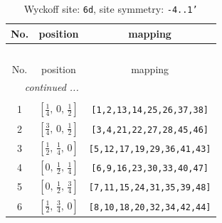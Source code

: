 \documentclass[fleqn,8pt]{jsarticle}
\begin{document}
\begin{longtable}{ccc}
\caption{Wyckoff site: {\tt 6d}, site symmetry: {\tt -4..1'}}
 \\
 \hline \hline
No. & position & mapping \\ \hline \endfirsthead

\multicolumn{2}{l}{\tablename\ \thetable{}} \\
 \hline \hline
No. & position & mapping \\ \hline \endhead

 \hline \hline
\multicolumn{2}{r}{\footnotesize\it continued ...} \\ \endfoot

 \hline \hline
\multicolumn{2}{r}{} \\ \endlastfoot

1 & $\left[ \frac{1}{4},\, 0,\, \frac{1}{2} \right]$ & {\tt [1,2,13,14,25,26,37,38]} \\ \hline
2 & $\left[ \frac{3}{4},\, 0,\, \frac{1}{2} \right]$ & {\tt [3,4,21,22,27,28,45,46]} \\ \hline
3 & $\left[ \frac{1}{2},\, \frac{1}{4},\, 0 \right]$ & {\tt [5,12,17,19,29,36,41,43]} \\ \hline
4 & $\left[ 0,\, \frac{1}{2},\, \frac{1}{4} \right]$ & {\tt [6,9,16,23,30,33,40,47]} \\ \hline
5 & $\left[ 0,\, \frac{1}{2},\, \frac{3}{4} \right]$ & {\tt [7,11,15,24,31,35,39,48]} \\ \hline
6 & $\left[ \frac{1}{2},\, \frac{3}{4},\, 0 \right]$ & {\tt [8,10,18,20,32,34,42,44]} \\
\end{longtable}
\renewcommand{\arraystretch}{1.2}
\end{document}
